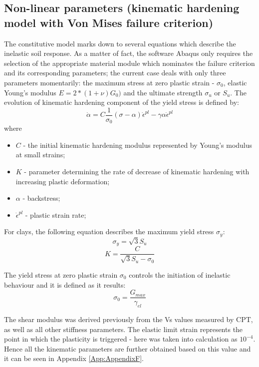 \documentclass[12pt,a4paper]{report}
\begin{document}
\newpage
\subsection{Non-linear parameters (kinematic hardening  model with Von Mises failure criterion)}
The constitutive model marks down to several equations which describe the inelastic soil response. As a matter of fact, the software Abaqus only requires the selection of the appropriate material module which nominates the failure criterion and its corresponding parameters; the current case deals with only three parameters momentarily: the maximum stress at zero plastic strain - $\sigma_0$, elastic Young's modulus $E=2*(1+\nu)G_0)$ and the ultimate strength $\sigma_u$ or $S_u$.
The evolution of kinematic hardening component of the yield stress is defined by:
\begin{equation}
		\dot{\alpha}=C\frac{1}{\sigma_0}(\sigma-\alpha)\dot{\epsilon}^{pl}-\gamma\alpha\dot{\epsilon}^{pl}
\end{equation}
where
\begin{itemize}
	\item $C$ - the initial kinematic hardening modulus represented by Young's modulus at small strains;
	\item $K$ - parameter determining the rate of decrease of kinematic hardening with increasing plastic deformation;
	\item $\alpha$ - backstress;
	\item $\dot{\epsilon}^{pl}$ - plastic strain rate;
\end{itemize}

For clays, the following equation describes the maximum yield stress $\sigma_y$:
\begin{equation}
	\sigma_y=\sqrt{3}S_u
\end{equation}
\begin{equation}
	K= \frac{C}{\sqrt{3}S_u-\sigma_0}
\end{equation}

The yield stress at zero plastic strain $\sigma_0$ controls the initiation of inelastic behaviour and it is defined as it results:
\begin{equation}
	\sigma_0=\frac{G_{max}}{\gamma_{el}}
\end{equation}

The shear modulus was derived previously from the Vs values measured by CPT, as well as all other stiffness parameters. The elastic limit strain represents the point in which the plasticity is triggered - here was taken into calculation as $10^{-4}$. Hence all the kinematic parameters are further obtained based on this value and it can be seen in Appendix \ref{App:AppendixF}.
\end{document}
